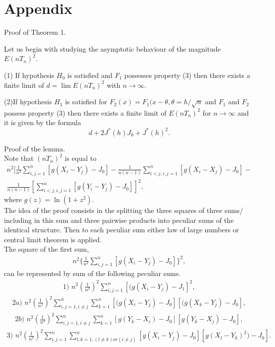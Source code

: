 \documentclass{svproc}
\begin{document}
\section{Appendix}
Proof of Theorem 1.

Let us begin with studying the asymptotic behaviour of the magnitude $E(nT_n)^2$.

\begin{lemma}
(1) If hypothesis $H_0$ is satisfied and $F_1$ possesses property (3) then there exists a finite limit of $d=\lim E(nT_n)^2$ with $n \to \infty.$

(2)If hypothesis $H_1$ is satisfied for $F_2(x)= F_1(x-\theta,\theta= h/\sqrt{n}$ and $F_1$ and $F_2$ possess property (3)  then there exists a finite  limit of $E(nT_n)^2$ for $n \to \infty$ and it is given by the formula
$$
d + 2J^*(h)J_0 + J^*(h)^2.
$$
\end{lemma}
Proof of the lemma.\\
Note that $(nT_n)^2$ is equal to
\begin{eqnarray*}
n^2 [\frac{1}{n^2}\sum_{i,j=1}^n [g(X_i - Y_j)-J_0]-\frac{1}{ n(n-1)}\sum_{i<j,i,j=1}^n  [g(X_i - X_j)-J_0] - \\ \frac{1}{n(n-1)}[\sum_{i<j,i,j=1}^n  [g(Y_i - Y_j)-J_0]]^2,
\end{eqnarray*}
where $g(z)= \ln(1+z^2).$\\
The idea of the proof consists in the splitting the three squares of three sums/ including in this sum and three
pairwise products into peculiar sums of the identical structure.
Then to each peculiar sum either law of large numbers or central limit theorem is applied.\\

The square of the first sum,
\begin{eqnarray*}
n^2 \{\frac{1}{n^2}\sum_{i,j=1}^n [g(X_i - Y_j)-J_0]\}^2,
\end{eqnarray*}
can be represented by sum of the following peculiar sums.
\begin{eqnarray*}
1)\,\,n^2 (\frac{1}{n^2})^2 \sum_{i,j=1}^n [(g(X_i - Y_j) -J_1]^2,
\end{eqnarray*}
\begin{eqnarray*}
2a)\,\,n^2(\frac{1}{n^2})^2 \sum_{i,j=1,i \ne j}^n\sum_{k=1}^n [(g(X_i - Y_j)-J_0][(g(X_k - Y_j)-J_0],
\end{eqnarray*}
\begin{eqnarray*}
2b)\,\,n^2(\frac{1}{n^2})^2 \sum_{i,j=1,i \ne j}^n\sum_{k=1}^n [g(Y_k - X_i)-J_0][g (Y_k - X_j)-J_0],
\end{eqnarray*}
\begin{eqnarray*}
3)\,\, n^2 (\frac{1}{n^2})^2 \sum_{i,j=1}^n\sum_{{l,k=1}, (l \ne  k)or(i\ne j)}^n  [g (X_i - Y_j)-J_0][g(X_l - Y_k)^2)-J_0].
\end{eqnarray*}
\end{document}
